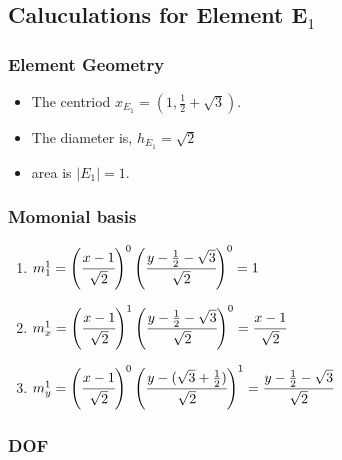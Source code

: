 \documentclass{article}
\begin{document}
\subsection{Caluculations for Element E$_1$}

\subsubsection{Element Geometry}
\begin{itemize}
    \item The centriod $x_{E_1} = (1, \frac{1}{2}+\sqrt{3}).$
    \item The diameter is, $ h_{E_1} = \sqrt{2}$
    \item area is $|E_1| = 1$.
\end{itemize}

\subsubsection{Momonial basis}

\begin{enumerate}
    \item $m_1^1 = \left(\cfrac{x - 1}{\sqrt{2}}\right)^{0}\left(\cfrac{y -\frac{1}{2} - \sqrt{3}}{\sqrt{2}}\right)^{0} = 1$
    
    \item $m_x^1 = \left(\cfrac{x - 1}{\sqrt{2}}\right)^{1}\left(\cfrac{y -\frac{1}{2} - \sqrt{3}}{\sqrt{2}}\right)^{0} = \cfrac{x - 1}{\sqrt{2}}$

    \item $m_y^1 = \left(\cfrac{x - 1}{\sqrt{2}}\right)^{0}\left(\cfrac{y -(\sqrt{3} +\frac{1}{2})}{\sqrt{2}}\right)^{1} = \cfrac{y - \frac{1}{2} - \sqrt{3}}{\sqrt{2}}$
\end{enumerate}


\subsubsection{DOF}
\end{document}
